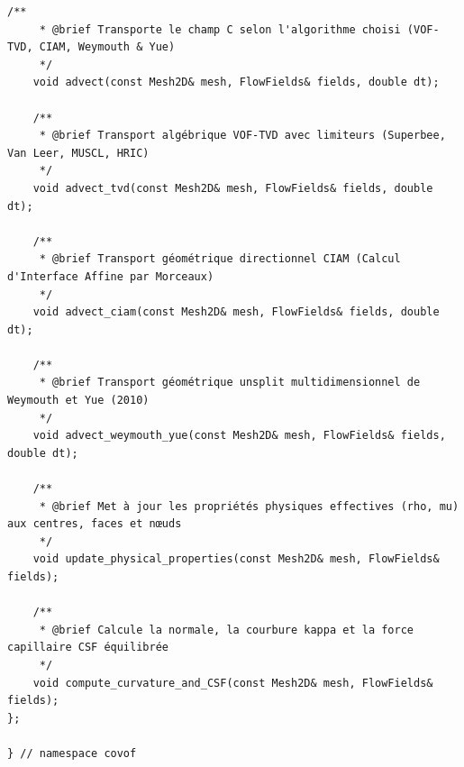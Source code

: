 \documentclass[10pt,a4paper,oneside]{book}
\begin{document}
\begin{lstlisting}[language={[11]C++}]
    /**
     * @brief Transporte le champ C selon l'algorithme choisi (VOF-TVD, CIAM, Weymouth & Yue)
     */
    void advect(const Mesh2D& mesh, FlowFields& fields, double dt);

    /**
     * @brief Transport algébrique VOF-TVD avec limiteurs (Superbee, Van Leer, MUSCL, HRIC)
     */
    void advect_tvd(const Mesh2D& mesh, FlowFields& fields, double dt);

    /**
     * @brief Transport géométrique directionnel CIAM (Calcul d'Interface Affine par Morceaux)
     */
    void advect_ciam(const Mesh2D& mesh, FlowFields& fields, double dt);

    /**
     * @brief Transport géométrique unsplit multidimensionnel de Weymouth et Yue (2010)
     */
    void advect_weymouth_yue(const Mesh2D& mesh, FlowFields& fields, double dt);

    /**
     * @brief Met à jour les propriétés physiques effectives (rho, mu) aux centres, faces et nœuds
     */
    void update_physical_properties(const Mesh2D& mesh, FlowFields& fields);

    /**
     * @brief Calcule la normale, la courbure kappa et la force capillaire CSF équilibrée
     */
    void compute_curvature_and_CSF(const Mesh2D& mesh, FlowFields& fields);
};

} // namespace covof

\end{lstlisting}
\end{document}
